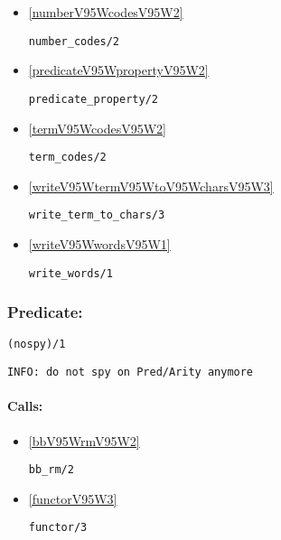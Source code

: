 \begin{itemize}
\item \ref{numberV95WcodesV95W2} 
\begin{verbatim}
number_codes/2
\end{verbatim}

\item \ref{predicateV95WpropertyV95W2} 
\begin{verbatim}
predicate_property/2
\end{verbatim}

\item \ref{termV95WcodesV95W2} 
\begin{verbatim}
term_codes/2
\end{verbatim}

\item \ref{writeV95WtermV95WtoV95WcharsV95W3} 
\begin{verbatim}
write_term_to_chars/3
\end{verbatim}

\item \ref{writeV95WwordsV95W1} 
\begin{verbatim}
write_words/1
\end{verbatim}

\end{itemize}

\subsubsection{Predicate:} \label{nospyV95W1}

\begin{verbatim}
(nospy)/1
\end{verbatim}

{\small \begin{verbatim}
INFO: do not spy on Pred/Arity anymore

\end{verbatim}}
\paragraph{Calls:} 
\begin{itemize}
\item \ref{bbV95WrmV95W2} 
\begin{verbatim}
bb_rm/2
\end{verbatim}

\item \ref{functorV95W3} 
\begin{verbatim}
functor/3
\end{verbatim}

\end{itemize}
